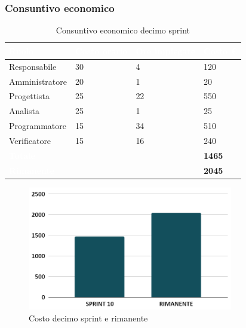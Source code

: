 \newpage
\subsubsection{Consuntivo economico}
{
\setlength{\tabcolsep}{10pt}
\renewcommand{\arraystretch}{1.5}
\begin{table}[h]
    \centering
    \begin{tabularx}{\textwidth}{| l | l | l | X |}
        \hline
        \rowcolor{headerrow} \textbf{\textcolor{white}{Ruolo}} & \textbf{\textcolor{white}{Costo orario}} & \textbf{\textcolor{white}{Ore impiegate}} & \textbf{\textcolor{white}{Costo €}} \\
        \hline
        Responsabile & 30 & 4 & 120\\
        \hline
        Amministratore & 20 & 1 & 20\\
        \hline
        Progettista & 25 & 22 & 550\\
        \hline
        Analista & 25 & 1 & 25\\
        \hline
        Programmatore & 15 & 34 & 510\\
        \hline
        Verificatore & 15 & 16 & 240\\
        \hline
        \cellcolor{headerrow} \textbf{\textcolor{white}{Totale}} &  &  & \textbf{1465}\\
        \hline
        \cellcolor{headerrow} \textbf{\textcolor{white}{Rimanente}} &  &  & \textbf{2045}\\
        \hline
    \end{tabularx}
    \caption{Consuntivo economico decimo sprint}
    \label{tab:consuntivocosti10sprint}
\end{table}
}

\begin{figure}[h!]
    \centering
    \includegraphics[width=0.8\textwidth]{cons10costo.png}
    \caption{Costo decimo sprint e rimanente}
    \label{fig:consuntivocosto10sprint}
\end{figure}

